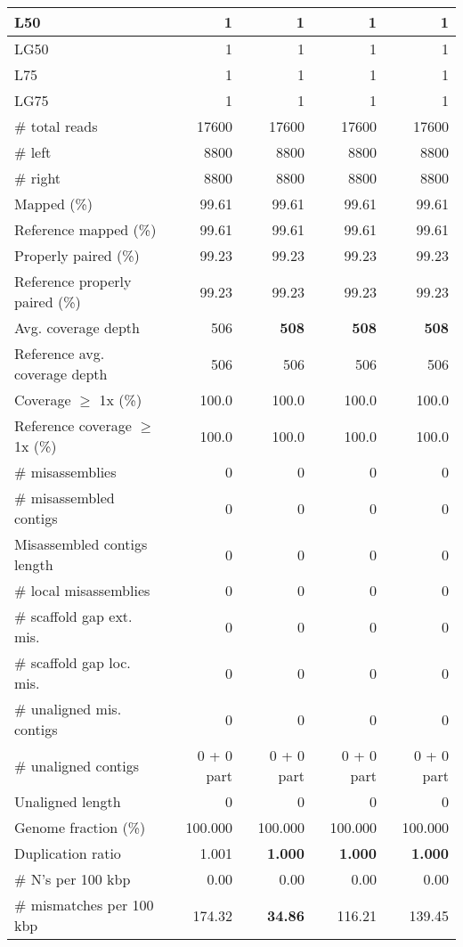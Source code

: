 \documentclass[12pt,a4paper]{article}
\begin{document}
\begin{table}[ht]
\begin{center}
\begin{tabular}{|l*{4}{|r}|}
L50 & 1 & 1 & 1 & 1 \\ \hline
LG50 & 1 & 1 & 1 & 1 \\ \hline
L75 & 1 & 1 & 1 & 1 \\ \hline
LG75 & 1 & 1 & 1 & 1 \\ \hline
\# total reads & 17600 & 17600 & 17600 & 17600 \\ \hline
\# left & 8800 & 8800 & 8800 & 8800 \\ \hline
\# right & 8800 & 8800 & 8800 & 8800 \\ \hline
Mapped (\%) & 99.61 & 99.61 & 99.61 & 99.61 \\ \hline
Reference mapped (\%) & 99.61 & 99.61 & 99.61 & 99.61 \\ \hline
Properly paired (\%) & 99.23 & 99.23 & 99.23 & 99.23 \\ \hline
Reference properly paired (\%) & 99.23 & 99.23 & 99.23 & 99.23 \\ \hline
Avg. coverage depth & 506 & {\bf 508} & {\bf 508} & {\bf 508} \\ \hline
Reference avg. coverage depth & 506 & 506 & 506 & 506 \\ \hline
Coverage $\geq$ 1x (\%) & 100.0 & 100.0 & 100.0 & 100.0 \\ \hline
Reference coverage $\geq$ 1x (\%) & 100.0 & 100.0 & 100.0 & 100.0 \\ \hline
\# misassemblies & 0 & 0 & 0 & 0 \\ \hline
\# misassembled contigs & 0 & 0 & 0 & 0 \\ \hline
Misassembled contigs length & 0 & 0 & 0 & 0 \\ \hline
\# local misassemblies & 0 & 0 & 0 & 0 \\ \hline
\# scaffold gap ext. mis. & 0 & 0 & 0 & 0 \\ \hline
\# scaffold gap loc. mis. & 0 & 0 & 0 & 0 \\ \hline
\# unaligned mis. contigs & 0 & 0 & 0 & 0 \\ \hline
\# unaligned contigs & 0 + 0 part & 0 + 0 part & 0 + 0 part & 0 + 0 part \\ \hline
Unaligned length & 0 & 0 & 0 & 0 \\ \hline
Genome fraction (\%) & 100.000 & 100.000 & 100.000 & 100.000 \\ \hline
Duplication ratio & 1.001 & {\bf 1.000} & {\bf 1.000} & {\bf 1.000} \\ \hline
\# N's per 100 kbp & 0.00 & 0.00 & 0.00 & 0.00 \\ \hline
\# mismatches per 100 kbp & 174.32 & {\bf 34.86} & 116.21 & 139.45 \\ \hline

\end{tabular}
\end{center}
\end{table}
\end{document}
